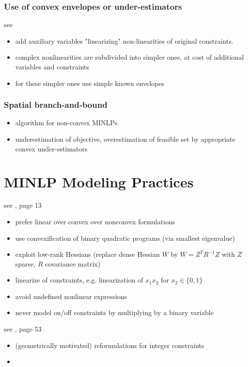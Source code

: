 \documentclass{article}
\begin{document}
\subsubsection{Use of convex envelopes or under-estimators}
see \cite{d2013mixed}
\begin{itemize}
\item add auxiliary variables "linearizing" non-linearities of original constraints. 
\item complex nonlinearities are subdivided into simpler ones, at cost of additional variables and constraints
\item for these simpler ones use simple known envelopes
\end{itemize}
\subsubsection{Spatial branch-and-bound}
\begin{itemize}
\item algorithm for non-convex MINLPs
\item underestimation of objective, overestimation of feasible set by appropriate convex under-estimators
\end{itemize}


\section{MINLP Modeling Practices}
see \cite{Belotti13}, page 13

\begin{itemize}
\item prefer linear over convex over nonconvex formulations
\item use convexification of binary quadratic programs (via smallest eigenvalue)
\item exploit low-rank Hessians (replace dense Hessian $W$ by $W = Z^T R^{-1} Z$ with $Z$ sparse, $R$ covariance matrix)
\item linearize of constraints, e.g. linearization of $x_1x_2$ for $x_2\in\{0,1\}$
\item avoid undefined nonlinear expressions
\item never model on/off constraints by multiplying by a binary variable
\end{itemize}

\noindent
see \cite{sager2005numerical}, page 53
\begin{itemize}
\item (geometrically motivated) reformulations for integer constraints
\item 
\end{itemize}
\end{document}

